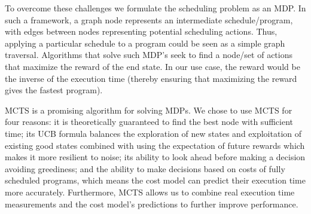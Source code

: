 







To overcome these challenges we formulate the scheduling problem as an MDP. In such a framework, a graph node represents an intermediate schedule/program, with edges between nodes representing potential scheduling actions. Thus, applying a particular schedule to a program could be seen as a simple graph traversal. Algorithms that solve such MDP's seek to find a node/set of actions that maximize the reward of the end state. In our use case, the reward would be the inverse of the execution time (thereby ensuring that maximizing the reward gives the fastest program).

MCTS is a promising algorithm for solving MDPs. We chose to use MCTS for four reasons: it is theoretically guaranteed to find the best node with sufficient time; its UCB formula balances the exploration of new states and exploitation of existing good states combined with using the expectation of future rewards which makes it more resilient to noise; its ability to look ahead before making a decision avoiding greediness; and the ability to make decisions based on costs of fully scheduled programs, which means the cost model can predict their execution time more accurately. Furthermore, MCTS allows us to combine real execution time measurements and the cost model's predictions to further improve performance.

